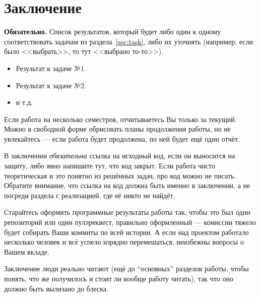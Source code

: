 
\section*{Заключение}
\textbf{Обязательно.} Список результатов, который будет либо один к одному соответствовать задачам из раздела~\ref{sec:task}, либо их уточнять (например, если было <<выбрать>>, то тут <<выбрано то-то>>).

\begin{itemize}
    \item Результат к задаче №1.
    \item Результат к задаче №2.
    \item и т.д.
\end{itemize}
\noindent Если работа на несколько семестров, отчитываетесь Вы только за текущий. Можно в свободной форме обрисовать планы продолжения работы, но не увлекайтесь --- если работа будет продолжена, по ней будет ещё один отчёт.

В заключении \emph{обязательна} ссылка на исходный код, если он выносится на защиту, либо явно напишите тут, что код закрыт. Если работа чисто теоретическая и это понятно из решённых задач, про код можно не писать. Обратите внимание, что ссылка на код должна быть именно в заключении, а не посреди раздела с реализацией, где её никто не найдёт.

Старайтесь оформить программные результаты работы так, чтобы это был один репозиторий или один пуллреквест, правильно оформленный --- комиссии тяжело будет собирать Ваши коммиты по всей истории. А если над проектом работало несколько человек и всё успело изрядно перемешаться, неизбежны вопросы о Вашем вкладе.

Заключение люди реально читают (ещё до \enquote{основных} разделов работы, чтобы понять, что же получилось и стоит ли вообще работу читать), так что оно должно быть вылизано до блеска.
